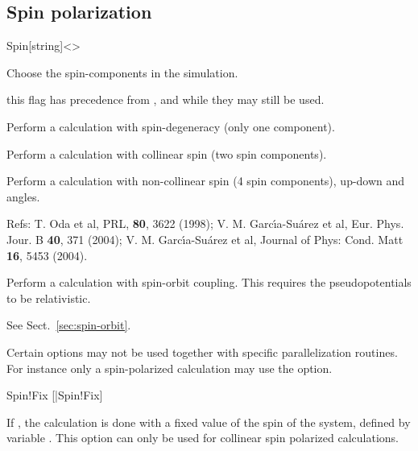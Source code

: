 \subsection{Spin polarization}

\begin{fdfentry}{Spin}[string]<>

  Choose the spin-components in the simulation.

  \note this flag has precedence from ,  and
   while they may still be used.
  \begin{fdfoptions}

    Perform a calculation with spin-degeneracy (only one component).

    \option[polarized]%
    Perform a calculation with collinear spin (two spin components).

    Perform a calculation with non-collinear spin (4 spin components),
    up-down and angles.

    Refs: T. Oda et al, PRL, \textbf{80}, 3622 (1998); 
    V. M. Garc\'{\i}a-Su\'arez et al, Eur. Phys. Jour. B \textbf{40}, 371 (2004);
    V. M. Garc\'{\i}a-Su\'arez et al, Journal of
    Phys: Cond. Matt \textbf{16}, 5453 (2004).

    Perform a calculation with spin-orbit coupling.  This requires the
    pseudopotentials to be relativistic.

    See Sect.~\ref{sec:spin-orbit}.

  \end{fdfoptions}

  Certain options may not be used together with specific
  parallelization routines.  For instance only a spin-polarized
  calculation may use the  option.
  
\end{fdfentry}

\begin{fdflogicalF}{Spin!Fix}
  [|Spin!Fix]

  If \fdftrue, the calculation is done with a fixed value of the spin
  of the system, defined by variable . This option can
  only be used for collinear spin polarized calculations.

\end{fdflogicalF}

